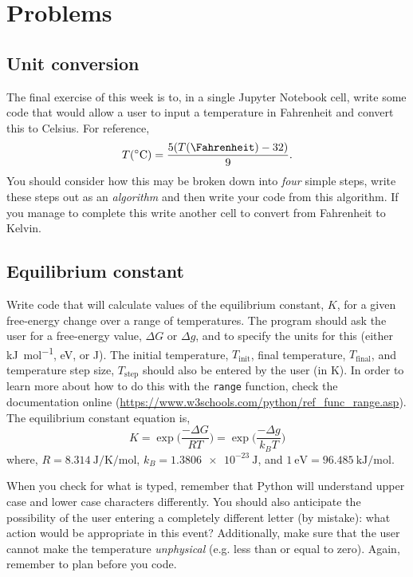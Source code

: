 \documentclass[a4paper]{article}
\begin{document}
\section{Problems}

\subsection{Unit conversion}

The final exercise of this week is to, in a single Jupyter Notebook cell, write some code that would allow a user to input a temperature in Fahrenheit and convert this to Celsius.
For reference,
\begin{equation}
	T (\si{\celsius}) = \frac{5 ( T(\si{\Fahrenheit}) - 32)}{9}.
\end{equation}
You should consider how this may be broken down into \emph{four} simple steps, write these steps out as an \emph{algorithm} and then write your code from this algorithm.
If you manage to complete this write another cell to convert from Fahrenheit to Kelvin.

\subsection{Equilibrium constant}

Write code that will calculate values of the equilibrium constant, $K$, for a given free-energy change over a range of temperatures.
The program should ask the user for a free-energy value, $\Delta G$ or $\Delta g$, and to specify the units for this (either \si{\kilo\joule\per\mol}, \si{\eV}, or \si{\joule}).
The initial temperature, $T_{\text{init}}$, final temperature, $T_{\text{final}}$, and temperature step size, $T_{\text{step}}$ should also be entered by the user (in \si{\kelvin}).
In order to learn more about how to do this with the \texttt{range} function, check the documentation online (\url{https://www.w3schools.com/python/ref_func_range.asp}).
The equilibrium constant equation is,
\begin{equation}
	K = \exp{\bigg(\frac{-\Delta G}{RT}\bigg)} = \exp{\bigg(\frac{-\Delta g}{k_BT}\bigg)}
\end{equation}
where, $R = \SI{8.314}{\joule\per\kelvin\per\mol}$, $k_B = \SI{1.3806e-23}{\joule}$, and $\SI{1}{\eV} = \SI{96.485}{\kilo\joule\per\mol}$.

When you check for what is typed, remember that Python will understand upper case and lower case characters differently.
You should also anticipate the possibility of the user entering a completely different letter (by mistake): what action would be appropriate in this event?
Additionally, make sure that the user cannot make the temperature \emph{unphysical} (e.g. less than or equal to zero).
Again, remember to plan before you code.
\end{document}
